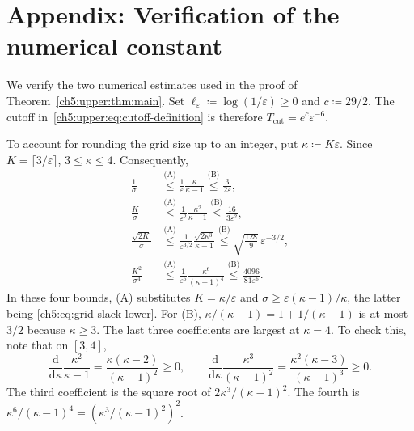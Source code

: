 \clearpage
\begingroup
\renewcommand{\thesection}{\thechapter.\Alph{section}}
\renewcommand{\theHsection}{\theHchapter.appendix.\Alph{section}}
\setcounter{section}{0}
\section{Appendix: Verification of the numerical constant}
\label{ch5:upper:sec:constant-verification}

We verify the two numerical estimates used in the proof of
Theorem~\ref{ch5:upper:thm:main}. Set
$\ell_\varepsilon\coloneqq\log(1/\varepsilon)\ge0$ and
$c\coloneqq29/2$. The cutoff in~\eqref{ch5:upper:eq:cutoff-definition}
is therefore $T_{\mathrm{cut}}=e^c\varepsilon^{-6}$.

To account for rounding the grid size up to an integer, put
$\kappa\coloneqq K\varepsilon$. Since $K=\lceil3/\varepsilon\rceil$,
$3\le\kappa\le4$. Consequently,
\begin{align}
 \frac1\sigma
 &\overset{\text{(A)}}{\le}\frac1\varepsilon\frac{\kappa}{\kappa-1}
 \overset{\text{(B)}}{\le}\frac3{2\varepsilon},
 \label{ch5:upper:eq:slack-coefficient}\\
 \frac K\sigma
 &\overset{\text{(A)}}{\le}\frac1{\varepsilon^2}\frac{\kappa^2}{\kappa-1}
 \overset{\text{(B)}}{\le}\frac{16}{3\varepsilon^2},
 \label{ch5:upper:eq:linear-grid-coefficient}\\
 \frac{\sqrt{2K}}\sigma
 &\overset{\text{(A)}}{\le}\frac1{\varepsilon^{3/2}}\frac{\sqrt{2\kappa^3}}{\kappa-1}
 \overset{\text{(B)}}{\le}\sqrt{\frac{128}{9}}\,\varepsilon^{-3/2},
 \label{ch5:upper:eq:square-root-grid-coefficient}\\
 \frac{K^2}{\sigma^4}
 &\overset{\text{(A)}}{\le}\frac1{\varepsilon^6}\frac{\kappa^6}{(\kappa-1)^4}
 \overset{\text{(B)}}{\le}\frac{4096}{81\varepsilon^6}.
 \label{ch5:upper:eq:drift-grid-coefficient}
\end{align}
In these four bounds, (A) substitutes $K=\kappa/\varepsilon$ and
$\sigma\ge\varepsilon(\kappa-1)/\kappa$, the latter being
\eqref{ch5:eq:grid-slack-lower}. For (B), $\kappa/(\kappa-1)=1+1/(\kappa-1)$ is at most
$3/2$ because $\kappa\ge3$. The last three coefficients are largest at $\kappa=4$.
To check this, note
that on $[3,4]$,
\[
 \frac{\mathrm d}{\mathrm d\kappa}\frac{\kappa^2}{\kappa-1}
 =\frac{\kappa(\kappa-2)}{(\kappa-1)^2}\ge0,
 \qquad
 \frac{\mathrm d}{\mathrm d\kappa}\frac{\kappa^3}{(\kappa-1)^2}
 =\frac{\kappa^2(\kappa-3)}{(\kappa-1)^3}\ge0.
\]
The third coefficient is the square root of $2\kappa^3/(\kappa-1)^2$.
The fourth is $\kappa^6/(\kappa-1)^4=(\kappa^3/(\kappa-1)^2)^2$.

